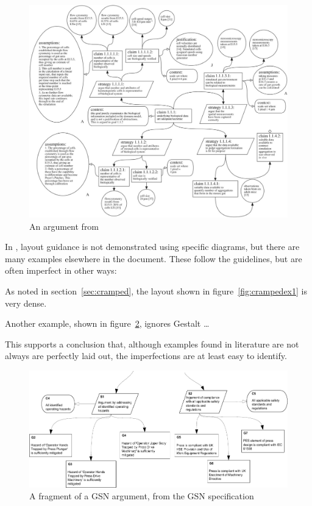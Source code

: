 \begin{figure}
    \includegraphics[width=\textwidth]{graphics/aldencentral.jpg}
    \caption{An argument from }
    \label{fig:aldencentral}
\end{figure}

In \cite{gsnstandard}, layout guidance is not demonstrated using specific diagrams, but there are many examples elsewhere in the document. These follow the guidelines, but are often imperfect in other ways:

\begin{itemize*}
\item As noted in section~\ref{sec:cramped}, the layout shown in figure~\ref{fig:crampedex1} is very dense.
\item Another example, shown in figure~\ref{fig:unalignedsiblings}, ignores  Gestalt \ldots
\end{itemize*}

This supports a conclusion that, although examples found in literature are not always are perfectly laid out, the imperfections are at least easy to identify.

\begin{figure}
    \includegraphics[width=\textwidth]{graphics/unaligned_siblings.pdf}
    \caption{A fragment of a GSN argument,
            from the GSN specification \citep[figure~42, section~2.3.6.5, pp.~34]{gsnstandard}}
    \label{fig:unalignedsiblings}
\end{figure}

